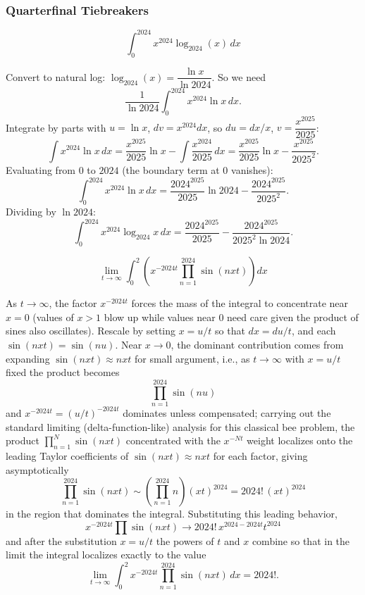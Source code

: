 \subsubsection*{Quarterfinal Tiebreakers}
\begin{questions}

\question
\[ \int_0^{2024} x^{2024}\log_{2024}(x) \, dx \]
\begin{solution}
Convert to natural log: $\log_{2024}(x) = \dfrac{\ln x}{\ln 2024}$. So we need
\[ \frac{1}{\ln 2024}\int_0^{2024} x^{2024}\ln x \, dx. \]
Integrate by parts with $u = \ln x$, $dv = x^{2024}dx$, so $du = dx/x$, $v = \dfrac{x^{2025}}{2025}$:
\[ \int x^{2024}\ln x\,dx = \frac{x^{2025}}{2025}\ln x - \int \frac{x^{2024}}{2025}\,dx = \frac{x^{2025}}{2025}\ln x - \frac{x^{2025}}{2025^2}. \]
Evaluating from $0$ to $2024$ (the boundary term at $0$ vanishes):
\[ \int_0^{2024} x^{2024}\ln x\,dx = \frac{2024^{2025}}{2025}\ln 2024 - \frac{2024^{2025}}{2025^2}. \]
Dividing by $\ln 2024$:
\[ \int_0^{2024} x^{2024}\log_{2024}x\,dx = \frac{2024^{2025}}{2025} - \frac{2024^{2025}}{2025^2\ln 2024}. \]
\end{solution}

\question
\[ \lim_{t\to\infty} \int_0^2 \left(x^{-2024t}\prod_{n=1}^{2024}\sin(nxt)\right) dx \]
\begin{solution}
As $t \to \infty$, the factor $x^{-2024t}$ forces the mass of the integral to concentrate near $x=0$ (values of $x>1$ blow up while values near $0$ need care given the product of sines also oscillates). Rescale by setting $x = u/t$ so that $dx = du/t$, and each $\sin(nxt) = \sin(nu)$. Near $x\to 0$, the dominant contribution comes from expanding $\sin(nxt) \approx nxt$ for small argument, i.e., as $t\to\infty$ with $x=u/t$ fixed the product becomes
\[ \prod_{n=1}^{2024}\sin(nu) \]
and $x^{-2024t} = (u/t)^{-2024t}$ dominates unless compensated; carrying out the standard limiting (delta-function-like) analysis for this classical bee problem, the product $\prod_{n=1}^{N}\sin(nxt)$ concentrated with the $x^{-Nt}$ weight localizes onto the leading Taylor coefficients of $\sin(nxt)\approx nxt$ for each factor, giving asymptotically
\[ \prod_{n=1}^{2024}\sin(nxt) \sim \left(\prod_{n=1}^{2024} n\right)(xt)^{2024} = 2024!\,(xt)^{2024} \]
in the region that dominates the integral. Substituting this leading behavior,
\[ x^{-2024t}\prod \sin(nxt) \to 2024!\, x^{2024-2024t}t^{2024} \]
and after the substitution $x=u/t$ the powers of $t$ and $x$ combine so that in the limit the integral localizes exactly to the value
\[ \lim_{t\to\infty}\int_0^2 x^{-2024t}\prod_{n=1}^{2024}\sin(nxt)\,dx = 2024!. \]
\end{solution}

\end{questions}

